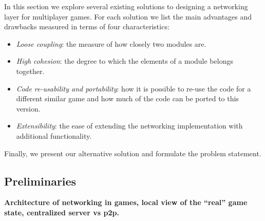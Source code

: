 In this section we explore several existing solutions to designing a networking layer for multiplayer games. For each solution we list the main advantages and drawbacks measured in terms of four characteristics:

\begin{itemize}[noitemsep]
	\item \textit{Loose coupling}: the measure of how closely two modules are.
	\item \textit{High cohesion}: the degree to which the elements of a module belongs together.
	\item \textit{Code re-usability and portability}: how it is possible to re-use the code for a different similar game and how much of the code can be ported to this version.
	\item \textit{Extensibility}: the ease of extending the networking implementation with additional functionality.
\end{itemize}

\noindent
Finally, we present our alternative solution and formulate the problem statement.

\subsection{Preliminaries}
\textbf{Architecture of networking in games, local view of the ``real'' game state, centralized server vs p2p.
}
